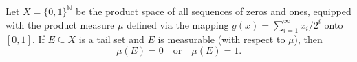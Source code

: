 Let $X = \{0,1\}^{\mathbb{N}}$ be the product space of all sequences of zeros and ones, equipped with the product measure $\mu$ defined via the mapping $g(x) = \sum_{i=1}^{\infty} x_i/2^i$ onto $[0,1]$. If $E \subseteq X$ is a tail set and $E$ is measurable (with respect to $\mu$), then
$$\mu(E) = 0 \quad \text{or} \quad \mu(E) = 1.$$
